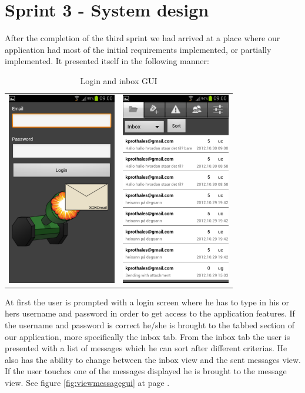 \section{Sprint 3 - System design}
After the completion of the third sprint we had arrived at a place where our application had most of the initial requirements implemented, or partially implemented. It presented itself in the following manner:
\newline
\newline
\begin{table}[h!]
\begin{center}
\begin{tabular}{cc}
\includegraphics{logingui} & \includegraphics{inbox}
\end{tabular}
\end{center}
\caption{Login and inbox GUI} \label{tab:logininboxgui}
\end{table}

At first the user is prompted with a login screen where he has to type in his or hers username and password in order to get access to the application features. If the username and password is correct he/she is brought to the tabbed section of our application, more specifically the inbox tab. From the inbox tab the user is presented with a list of messages which he can sort after different criterias. He also has the ability to change between the inbox view and the sent messages view. If the user touches one of the messages displayed he is brought to the message view. See figure \ref{fig:viewmessagegui} at page \pageref{fig:viewmessagegui}.
\newline

